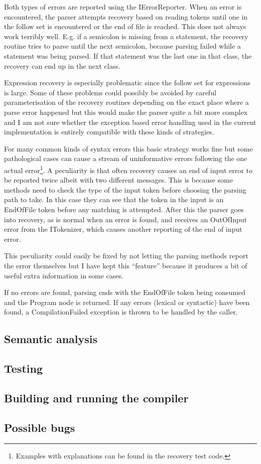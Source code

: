 \documentclass[a4paper,11pt]{article}
\begin{document}
Both types of errors are reported using the IErrorReporter. When an error is encountered, the parser attempts recovery based on reading tokens until one in the follow set is encountered or the end of file is reached. This does not always work terribly well. E.g. if a semicolon is missing from a statement, the recovery routine tries to parse until the next semicolon, because parsing failed while a statement was being parsed. If that statement was the last one in that class, the recovery can end up in the next class.

Expression recovery is especially problematic since the follow set for expressions is large. Some of these problems could possibly be avoided by careful parameterisation of the recovery routines depending on the exact place where a parse error happened but this would make the parser quite a bit more complex and I am not sure whether the exception based error handling used in the current implementation is entirely compatible with these kinds of strategies.

For many common kinds of syntax errors this basic strategy works fine but some pathological cases can cause a stream of uninformative errors following the one actual error\footnote{Examples with explanations can be found in the recovery test code.}. A peculiarity is that often recovery causes an end of input error to be reported twice albeit with two different messages. This is because some methods need to check the type of the input token before choosing the parsing path to take. In this case they can see that the token in the input is an EndOfFile token before any matching is attempted. After this the parser goes into recovery, as is normal when an error is found, and receives an OutOfInput error from the ITokenizer, which causes another reporting of the end of input error.

This peculiarity could easily be fixed by not letting the parsing methods report the error themselves but I have kept this ``feature'' because it produces a bit of useful extra information in some cases.

If no errors are found, parsing ends with the EndOfFile token being consumed and the Program node is returned. If any errors (lexical or syntactic) have been found, a CompilationFailed exception is thrown to be handled by the caller.

\subsection{Semantic analysis}


\subsection{Testing}

\subsection{Building and running the compiler}

\subsection{Possible bugs}
\end{document}
